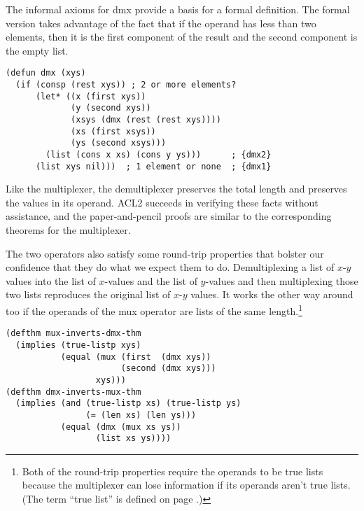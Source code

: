 The informal axioms for \textsf{dmx} provide a basis for a formal definition.
The formal version takes advantage of the fact that if the operand
has less than two elements, then it is the first component of the result
and the second component is the empty list.

\label{dmx-defun}
\begin{code}
\begin{verbatim}
(defun dmx (xys)
  (if (consp (rest xys)) ; 2 or more elements?
      (let* ((x (first xys))
             (y (second xys))
             (xsys (dmx (rest (rest xys))))
             (xs (first xsys))
             (ys (second xsys)))
        (list (cons x xs) (cons y ys)))      ; {dmx2}
      (list xys nil)))  ; 1 element or none  ; {dmx1}
\end{verbatim}
\end{code}

Like the multiplexer,
the demultiplexer preserves the total length
and preserves the values in its operand.
ACL2 succeeds in verifying these facts without assistance,
and the paper-and-pencil proofs are similar to the corresponding
theorems for the multiplexer.

The two operators also satisfy some round-trip properties
that bolster our confidence that they do what we expect them to do.
Demultiplexing a list of $x$-$y$ values into the list of
$x$-values and the list of $y$-values and then multiplexing
those two lists reproduces the original list of $x$-$y$ values.
It works the other way around too if the operands of
the \textsf{mux} operator are lists of the same length.\footnote{Both
of the round-trip properties require the operands to be
true lists because the multiplexer can lose information
if its operands aren't true lists.
(The term ``true list'' is defined on page \pageref{true-list-def}.)}

\label{thm:mux-inverts-dmx}\label{thm:dmx-inverts-mux}
\begin{code}
\begin{verbatim}
(defthm mux-inverts-dmx-thm
  (implies (true-listp xys)
           (equal (mux (first  (dmx xys))
                       (second (dmx xys)))
                  xys)))
(defthm dmx-inverts-mux-thm
  (implies (and (true-listp xs) (true-listp ys)
                (= (len xs) (len ys)))
           (equal (dmx (mux xs ys))
                  (list xs ys))))
\end{verbatim}
\end{code}

